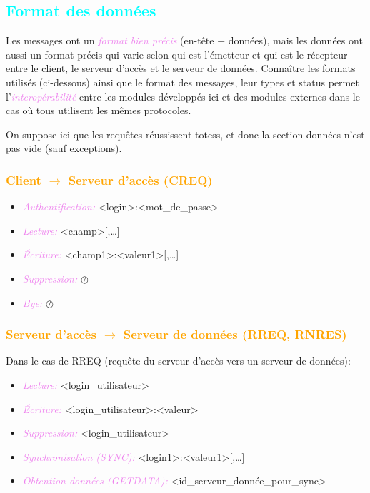 \documentclass[a4paper]{article}
\newcommand{\ra}{\rightarrow}
\let\oldsubsection\subsection{}
\renewcommand{\subsection}[1]{\textcolor{cyan}{\oldsubsection{#1}}}
\let\oldsubsubsection\subsubsection{}
\renewcommand{\subsubsection}[1]{\textcolor{orange}{\oldsubsubsection{#1}}}
\let\oldtextit\textit
\renewcommand{\textit}[1]{\textcolor{violet}{\oldtextit{#1}}}
\begin{document}
\subsection{Format des données}

Les messages ont un \textit{format bien précis} (en-tête + données), mais les données ont aussi un format précis qui varie selon qui est l'émetteur et qui est le récepteur entre le client, le serveur d'accès et le serveur de données. Connaître les formats utilisés (ci-dessous) ainsi que le format des messages, leur types et status permet l'\textit{interopérabilité} entre les modules développés ici et des modules externes dans le cas où tous utilisent les mêmes protocoles.

On suppose ici que les requêtes réussissent totess, et donc la section données n'est pas vide (sauf exceptions).

\subsubsection{Client $\ra$ Serveur d'accès (CREQ)}

\begin{itemize}
    \item \textit{Authentification:} <login>:<mot\_de\_passe>
    \item \textit{Lecture:} <champ>[,\ldots]
    \item \textit{Écriture:} <champ1>:<valeur1>[,\ldots]
    \item \textit{Suppression:} $\oslash$
    \item \textit{Bye:} $\oslash$
\end{itemize}

\subsubsection{Serveur d'accès $\ra$ Serveur de données (RREQ, RNRES)}

Dans le cas de RREQ (requête du serveur d'accès vers un serveur de données):
\begin{itemize}
    \item \textit{Lecture:} <login\_utilisateur>
    \item \textit{Écriture:} <login\_utilisateur>:<valeur>
    \item \textit{Suppression:} <login\_utilisateur>
    \item \textit{Synchronisation (SYNC):} <login1>:<valeur1>[,\ldots]
    \item \textit{Obtention données (GETDATA):} <id\_serveur\_donnée\_pour\_sync>
\end{itemize}
\end{document}

